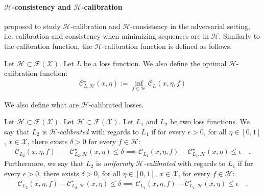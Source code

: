 \paragraph{$\mathcal{H}$-consistency and  $\mathcal{H}$-calibration}
\citet{bao2020calibrated,awasthi2021calibration,awasthi2021finer} proposed to study $\mathcal{H}$-calibration and $\mathcal{H}$-consistency in the adversarial setting, i.e. calibration and consistency when minimizing sequences are in $\mathcal{H}$.  Similarly to the calibration function, the $\mathcal{H}$-calibration function is defined as follows.

\begin{definition}
    Let $\mathcal{H}\subset \mathcal{F}(\mathcal{X})$. Let $L$ be a loss function. We also define the optimal $\mathcal{H}$-calibration function:
    \begin{align*}
            \mathcal{C}^\star_{L,\mathcal{H}}(x,\eta):=\inf_{f\in\mathcal{H}}\mathcal{C}_L(x,\eta,f)
    \end{align*}
    
\end{definition}
    
We also define what are $\mathcal{H}$-calibrated losses.
    
\begin{definition}
Let $\mathcal{H}\subset \mathcal{F}(\mathcal{X})$. Let $\mathcal{H}\subset \mathcal{F}(\mathcal{X})$. Let $L_1$ and $L_2$ be two loss functions. We say that $L_2$ is \emph{$\mathcal{H}$-calibrated} with regards to $L_1$ if for every $\epsilon>0$,  for all $\eta\in[0,1]$, $x\in\mathcal{X}$, there exists $ \delta>0$ for every $f\in\mathcal{H}$: 
\begin{align*}
    \mathcal{C}_{L_2}(x,\eta,f)- &\mathcal{C}^\star_{L_2,\mathcal{H}}(x,\eta)\leq\delta\implies\mathcal{C}_{L_1}(x,\eta,f)- \mathcal{C}^\star_{L_1,\mathcal{H}}(x,\eta)\leq \epsilon\quad.
\end{align*}
Furthermore, we say that $L_2$ is \emph{uniformly $\mathcal{H}$-calibrated} with regards to $L_1$ if for every $\epsilon>0$, there exists $ \delta>0$, for all $\eta\in[0,1]$, $x\in\mathcal{X}$, for every $f\in\mathcal{H}$: 
\begin{align*}
    \mathcal{C}_{L_2}(x,\eta,f)- \mathcal{C}^\star_{L_2,\mathcal{H}}(x,\eta)\leq\delta\implies\mathcal{C}_{L_1}(x,\eta,f)- \mathcal{C}^\star_{L_1,\mathcal{H}}(x,\eta)\leq \epsilon\quad.
\end{align*}
\end{definition}
    

